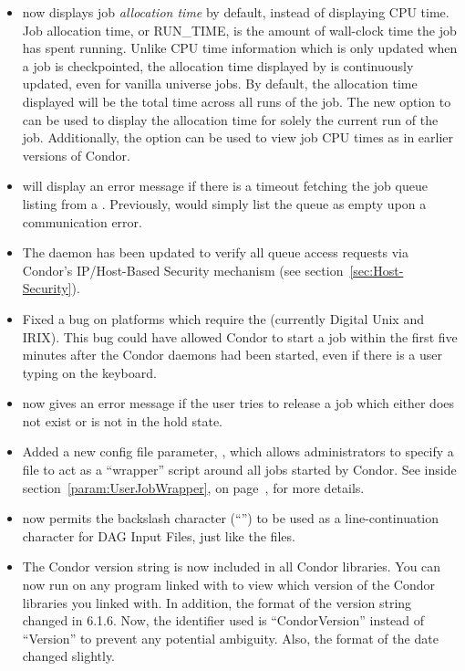 \begin{itemize}
\item {} now displays job \emph{allocation time} by default, instead
of displaying CPU time.  
Job allocation time, or RUN\_TIME, is the amount of wall-clock time the job
has spent running.  
Unlike CPU time information which is only updated when a job is
checkpointed, the allocation time displayed by  is continuously
updated, even for vanilla universe jobs.  
By default, the allocation time displayed will be the total time across all
runs of the job.  
The new  option to  can be used to display the
allocation time for solely the current run of the job.
Additionally, the  option can be used to view job CPU times as
in earlier versions of Condor.

\item {} will display an error message if there is a timeout
fetching the job queue listing from a .  Previously,
 would simply list the queue as empty upon a communication error.

\item The  daemon has been updated to verify all queue access
requests via Condor's IP/Host-Based Security mechanism (see
section~\ref{sec:Host-Security}).

\item Fixed a bug on platforms which require the  (currently
Digital Unix and IRIX).  
This bug could have allowed Condor to start a job within the first five
minutes after the Condor daemons had been started, even if there is a user
typing on the keyboard.

\item {} now gives an error message if the user tries to
release a job which either does not exist or is not in the hold state.

\item Added a new config file parameter, , which
allows administrators to specify a file to act as a ``wrapper'' script
around all jobs started by Condor. 
See inside section~\ref{param:UserJobWrapper}, on 
page~\pageref{sec:Starter-Config-File-Entries}, for more details.

\item {} now permits the backslash character (``\Bs'') to be used
as a line-continuation character for DAG Input Files, just like the
 files.

\item The Condor version string is now included in all Condor
libraries.
You can now run  on any program linked with
 to view which version of the Condor libraries you
linked with.
In addition, the format of the version string changed in 6.1.6.
Now, the identifier used is ``CondorVersion'' instead of ``Version''
to prevent any potential ambiguity.
Also, the format of the date changed slightly.


\end{itemize}
